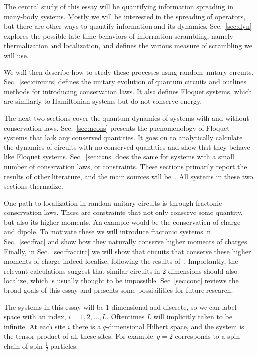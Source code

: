 \documentclass[a4paper,11pt]{article}
\newcommand{\half}{\frac{1}{2}}
\newcommand{\note}[1]{{\color{red}{#1}}}
\begin{document}
The central study of this essay will be quantifying information spreading in many-body systems. Mostly we will be interested in the spreading of operators, but there are other ways to quantify information and its dynamics. Sec.~\ref{sec:dyn} explores the possible late-time behaviors of information scrambling, namely thermalization and localization, and defines the various measure of scrambling we will use.

We will then describe how to study these processes using random unitary circuits. Sec.~\ref{sec:circuits} defines the unitary evolution of quantum circuits and outlines methods for introducing conservation laws. It also defines Floquet systems, which are similarly to Hamiltonian systems but do not conserve energy.

The next two sections cover the quantum dynamics of systems with and without conservation laws. Sec.~\ref{sec:ncons} presents the phenomenology of Floquet systems that lack any conserved quantities. It goes on to analytically calculate the dynamics of circuits with no conserved quantities and show that they behave like Floquet systems.
\note{The analytic behavior\dots classical behavior\dots reason for circuits}
Sec.~\ref{sec:cons} does the same for systems with a small number of conservation laws, or constraints. These sections primarily report the results of other literature, and the main sources will be~\cite{ChenOtoc, vonKeyserlingkHydro, NahumOpSp, KhemaniOpSp}. All systems in these two sections thermalize. 

One path to localization in random unitary circuits is through fractonic conservation laws. These are constraints that not only conserve some quantity, but also its higher moments. An example would be the conservation of charge and dipole.
To motivate these we will introduce fractonic systems in Sec.~\ref{sec:frac} and show how they naturally conserve higher moments of charges. Finally, in Sec.~\ref{sec:fraccirc} we will show that circuits that conserve these higher moments of charge indeed localize, following the results of~\cite{PaiFracton}. Importantly, the relevant calculations suggest that similar circuits in 2 dimensions should also localize, which is usually thought to be impossible.
Sec~\ref{sec:conc} reviews the broad goals of this essay and presents some possibilities for future research.

The systems in this essay will be 1 dimensional and discrete, so we can label space with an index, $i = 1,2,\dots,L$. Oftentimes $L$ will implicitly taken to be infinite. At each site $i$ there is a $q$-dimensional Hilbert space, and the system is the tensor product of all these sites. For example, $q=2$ corresponds to a spin chain of spin-$\half$ particles.
\end{document}
